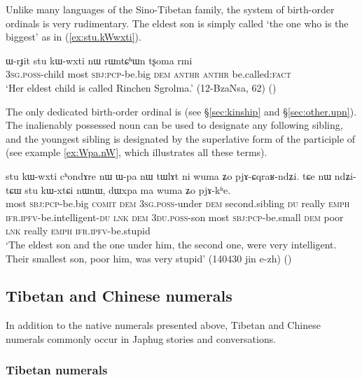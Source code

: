 Unlike many languages of the Sino-Tibetan family, the system of birth-order ordinals is very rudimentary. The eldest son is simply called  `the one who is the biggest' as in (\ref{ex:stu.kWwxti}).

\begin{exe}
\ex  \label{ex:stu.kWwxti}
\gll ɯ-rɟit stu kɯ-wxti nɯ rɯntɕʰɯn tʂoma rmi\\
\textsc{3sg}.\textsc{poss}-child most \textsc{sbj}:\textsc{pcp}-be.big \textsc{dem}  \textsc{anthr} \textsc{anthr} be.called:\textsc{fact}\\
\glt `Her eldest child is called Rinchen Sgrolma.' (12-BzaNsa, 62)
()
\end{exe}

The only dedicated birth-order ordinal is  (see §\ref{sec:kinship} and §\ref{sec:other.upn}). The inalienably possessed noun  can be used to designate any following sibling, and the youngest sibling is designated by the superlative form of the participle of  (see example \ref{ex:Wpa.nW}, which illustrates all these terms).

\begin{exe}
\ex  \label{ex:Wpa.nW}
\gll stu kɯ-wxti cʰondɤre nɯ ɯ-pa nɯ tɯlɤt ni wuma ʑo pjɤ-ɕqraʁ-ndʑi. tɕe nɯ ndʑi-tɕɯ stu kɯ-xtɕi nɯnɯ, dɯxpa ma wuma ʑo pjɤ-kʰe. \\
most \textsc{sbj}:\textsc{pcp}-be.big \textsc{comit} \textsc{dem} \textsc{3sg}.\textsc{poss}-under \textsc{dem} second.sibling \textsc{du} really \textsc{emph} \textsc{ifr}.\textsc{ipfv}-be.intelligent-\textsc{du} \textsc{lnk} \textsc{dem} \textsc{3du}.\textsc{poss}-son most \textsc{sbj}:\textsc{pcp}-be.small \textsc{dem} poor \textsc{lnk} really \textsc{emph} \textsc{ifr}.\textsc{ipfv}-be.stupid \\
\glt `The eldest son and the one under him, the second one, were very intelligent. Their smallest son, poor him, was very stupid' (140430 jin e-zh) ()
\end{exe}
 
\subsection{Tibetan and Chinese numerals}  
In addition to the native numerals presented above, Tibetan and Chinese numerals commonly occur in Japhug stories and conversations.

 \subsubsection{Tibetan numerals} \label{sec:tibetan.numerals}

